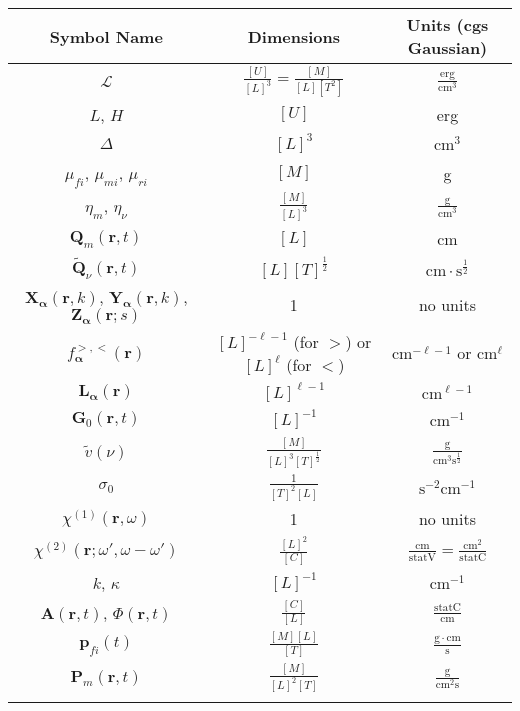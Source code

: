 \documentclass{article}
\begin{document}
\begin{center}
\def\arraystretch{1.5}
\begin{longtable}{c|c|c}
    Symbol Name & Dimensions & Units (cgs Gaussian) \\
    \hline
    $\mathcal{L}$ & $\frac{[U]}{[L]^3} = \frac{[M]}{[L][T^2]}$ & $\frac{\mathrm{erg}}{\mathrm{cm}^3}$\\
    $L$, $H$ & $[U]$ & erg\\
    $\Delta$ & $[L]^3$ & cm$^3$\\
    $\mu_{fi}$, $\mu_{mi}$, $\mu_{ri}$ & $[M]$ & g\\
    $\eta_m$, $\eta_\nu$ & $\frac{[M]}{[L]^3}$ & $\frac{\mathrm{g}}{\mathrm{cm}^3}$\\
    $\mathbf{Q}_m(\mathbf{r},t)$ & $[L]$ & cm\\
    $\tilde{\mathbf{Q}}_\nu(\mathbf{r},t)$ & $[L][T]^\frac{1}{2}$ & $\mathrm{cm}\cdot \mathrm{s}^\frac{1}{2}$\\
    $\mathbf{X}_{\bm{\alpha}}(\mathbf{r},k)$, $\mathbf{Y}_{\bm{\alpha}}(\mathbf{r},k)$, $\mathbf{Z}_{\bm{\alpha}}(\mathbf{r};s)$ & 1 & no units\\
    $f_{\bm{\alpha}}^{>,<}(\mathbf{r})$ & $[L]^{-\ell-1}$ (for $>$) or $[L]^{\ell}$ (for $<$) & $\mathrm{cm}^{-\ell-1}$ or $\mathrm{cm}^\ell$\\
    $\mathbf{L}_{\bm{\alpha}}(\mathbf{r})$ & $[L]^{\ell - 1}$ & $\mathrm{cm}^{\ell - 1}$\\
    $\mathbf{G}_0(\mathbf{r},t)$ & $[L]^{-1}$ & cm$^{-1}$\\
    $\tilde{v}(\nu)$ & $\frac{[M]}{[L]^3[T]^\frac{1}{2}}$ & $\frac{\mathrm{g}}{\mathrm{cm}^3\mathrm{s}^\frac{1}{2}}$\\
    $\sigma_0$ & $\frac{1}{[T]^2[L]}$ & $\mathrm{s}^{-2}$$\mathrm{cm}^{-1}$\\
    $\chi^{(1)}(\mathbf{r},\omega)$ & 1 & no units\\
    $\chi^{(2)}(\mathbf{r};\omega',\omega - \omega')$ & $\frac{[L]^2}{[C]}$ & $\frac{\mathrm{cm}}{\mathrm{statV}} = \frac{\mathrm{cm}^2}{\mathrm{statC}}$\\
    $k$, $\kappa$ & $[L]^{-1}$ & cm$^{-1}$\\
    $\mathbf{A}(\mathbf{r},t)$, $\Phi(\mathbf{r},t)$ & $\frac{[C]}{[L]}$ & $\frac{\mathrm{statC}}{\mathrm{cm}}$\\
    $\mathbf{p}_{fi}(t)$ & $\frac{[M][L]}{[T]}$ & $\frac{\mathrm{g}\cdot\mathrm{cm}}{\mathrm{s}}$\\
    $\mathbf{P}_m(\mathbf{r},t)$ & $\frac{[M]}{[L]^2[T]}$ & $\frac{\mathrm{g}}{\mathrm{cm}^2\mathrm{s}}$\\
$$
\end{longtable}
\end{center}
\end{document}
